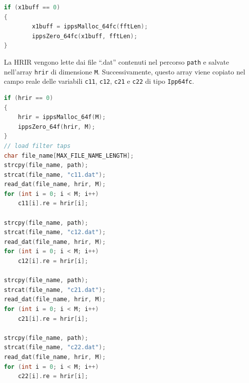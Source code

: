 \documentclass[12pt,a4paper,titlepage]{article}
\begin{document}
\begin{lstlisting}[language=cpp, label=code:allocazione_fd, caption = Allocazione della variabile \texttt{x1buff} nella funzione \texttt{LEPlugin\_Init}, breaklines = false, captionpos = b]
if (x1buff == 0)
{
		x1buff = ippsMalloc_64fc(fftLen);
		ippsZero_64fc(x1buff, fftLen);
}
\end{lstlisting}

La HRIR vengono lette dai file ``.dat'' contenuti nel percorso \texttt{path} e salvate nell'array \texttt{hrir} di dimensione \texttt{M}. Successivamente, questo array viene copiato nel campo reale delle variabili \texttt{c11}, \texttt{c12}, \texttt{c21} e \texttt{c22} di tipo \texttt{Ipp64fc}.

\begin{lstlisting}[language=cpp, label=code:lettura_hrir, caption = Lettura delle HRIR, breaklines = false, captionpos = b]
if (hrir == 0)
{
	hrir = ippsMalloc_64f(M);
	ippsZero_64f(hrir, M);
}
// load filter taps
char file_name[MAX_FILE_NAME_LENGTH];
strcpy(file_name, path);
strcat(file_name, "c11.dat");
read_dat(file_name, hrir, M);
for (int i = 0; i < M; i++)
	c11[i].re = hrir[i];

strcpy(file_name, path);
strcat(file_name, "c12.dat");
read_dat(file_name, hrir, M);
for (int i = 0; i < M; i++)
	c12[i].re = hrir[i];

strcpy(file_name, path);
strcat(file_name, "c21.dat");
read_dat(file_name, hrir, M);
for (int i = 0; i < M; i++)
	c21[i].re = hrir[i];

strcpy(file_name, path);
strcat(file_name, "c22.dat");
read_dat(file_name, hrir, M);
for (int i = 0; i < M; i++)
	c22[i].re = hrir[i];
\end{lstlisting}
	
\end{document}
